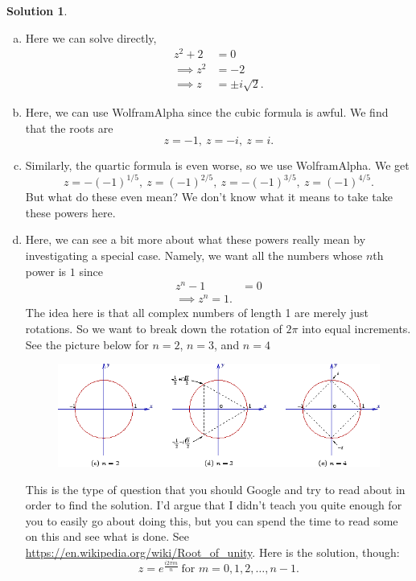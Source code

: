 \documentclass[12pt]{report} %
\theoremstyle{definition}
\newtheorem{solution}{Solution}
\begin{document}
\begin{solution}~
\begin{enumerate}[(a)]
    \item Here we can solve directly,
    \begin{align*}
        z^2+2&=0\\
        \implies z^2&=-2\\
        \implies z &= \pm i\sqrt{2}.
    \end{align*}
    \item Here, we can use WolframAlpha since the cubic formula is awful. We find that the roots are
    \[
    z= -1, ~ z=-i, ~ z=i.
    \]
    \item Similarly, the quartic formula is even worse, so we use WolframAlpha. We get
    \[
    z=-(-1)^{1/5}, ~z=(-1)^{2/5}, ~z=-(-1)^{3/5}, ~z=(-1)^{4/5}.
    \]
    But what do these even mean? We don't know what it means to take take these powers here.  
    \item Here, we can see a bit more about what these powers really mean by investigating a special case.  Namely, we want all the numbers whose $n$th power is $1$ since
    \begin{align*}
        z^n-1&=0\\
        \implies z^n = 1.
    \end{align*}
    The idea here is that all complex numbers of length 1 are merely just rotations.  So we want to break down the rotation of $2\pi$ into equal increments. See the picture below for $n=2$, $n=3$, and $n=4$
    \begin{figure}[H]
        \centering
        \includegraphics[width=\textwidth]{Images/roots_unity.png}
    \end{figure}
    This is the type of question that you should Google and try to read about in order to find the solution.  I'd argue that I didn't teach you quite enough for you to easily go about doing this, but you can spend the time to read some on this and see what is done.  See \url{https://en.wikipedia.org/wiki/Root_of_unity}.  Here is the solution, though:
    \[
    z = e^{\frac{i2\pi m}{n}} ~\textrm{for } m=0,1,2, \dots, n-1. 
    \]
\end{enumerate}
\end{solution}
\end{document}

